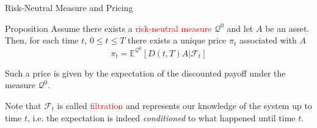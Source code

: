 \documentclass{beamer}
\begin{document}
\begin{frame}{Risk-Neutral Measure and Pricing}

\begin{block}{Proposition}
	Assume there exists a \textcolor{red}{risk-neutral measure} $\mathcal{Q}^0$ %
	and let $A$ be an asset. Then, for each time $t$, $0\le t\le T$ there exists a unique price $\pi_t$ associated with $A$
	\begin{equation}
		\pi_t = \mathbb{E}^{\mathcal{Q}^0}[D(t,T)A|\mathcal{F}_t]
		\label{eq:risk_neutral_pricing}
	\end{equation}
\end{block}

Such a price is given by the expectation of the discounted payoff under the measure $\mathcal{Q}^0$.

Note that $\mathcal{F}_t$ is called \textcolor{red}{filtration} and represents our knowledge of the system up to time $t$, i.e. the expectation is indeed \emph{conditioned} to what happened until time $t$.


\end{frame}
\end{document}
